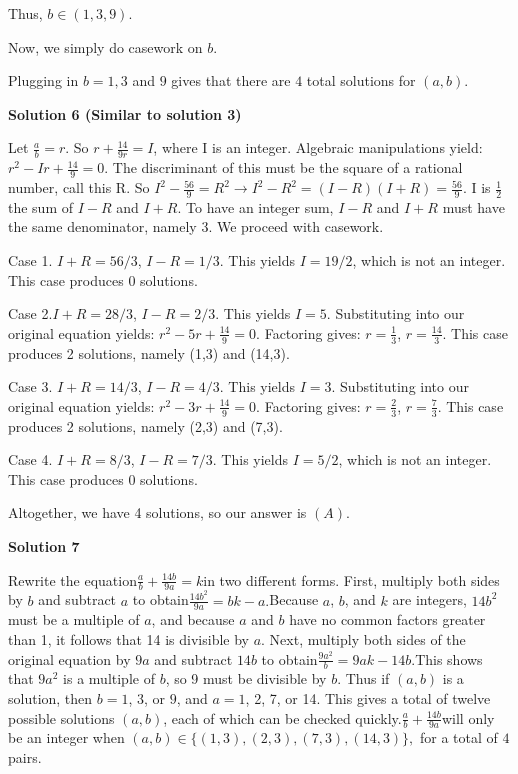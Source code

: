 \begin{enumerate}
 Thus, $b \in (1,3,9).$

 Now, we simply do casework on $b.$ 

 Plugging in $b = 1,3$ and $9$ gives that there are $4$ total solutions for $(a,b).$




\textbf{Solution 6 (Similar to solution 3)}

Let $\frac{a}{b} = r.$ So $r + \frac{14}{9r}=I$, where I is an integer. Algebraic manipulations yield: $r^2-Ir+\frac{14}{9}=0$. The discriminant of this must be the square of a rational number, call this R. So $I^2-\frac{56}{9}=R^2 \longrightarrow I^2-R^2=(I-R)(I+R)=\frac{56}{9}$. I is $\frac{1}{2}$ the sum of $I-R$ and $I+R$. To have an integer sum, $I-R$ and $I+R$ must have the same denominator, namely 3. We proceed with casework.

 Case 1. $I+R=56/3$, $I-R=1/3$. This yields $I=19/2$, which is not an integer. This case produces 0 solutions.

 Case 2.$I+R=28/3$, $I-R=2/3$. This yields $I=5$. Substituting into our original equation yields: $r^2-5r+\frac{14}{9}=0$. Factoring gives: $r=\frac{1}{3}$, $r=\frac{14}{3}$. This case produces 2 solutions, namely (1,3) and (14,3).

 Case 3. $I+R=14/3$, $I-R=4/3$. This yields $I=3$. Substituting into our original equation yields: $r^2-3r+\frac{14}{9}=0$. Factoring gives: $r=\frac{2}{3}$, $r=\frac{7}{3}$. This case produces 2 solutions, namely (2,3) and (7,3).

 Case 4. $I+R=8/3$, $I-R=7/3$. This yields $I=5/2$, which is not an integer. This case produces 0 solutions.

 Altogether, we have 4 solutions, so our answer is $\boxed{(A)}$.

 



\textbf{Solution 7}

Rewrite the equation$\frac{a}{b}+\frac{14b}{9a}=k$in two different forms. First, multiply both sides by $b$ and subtract $a$ to obtain$\frac{14b^2}{9a}=bk-a.$Because $a$, $b$, and $k$ are integers, $14b^2$ must be a multiple of $a$, and because $a$ and $b$ have no common factors greater than 1, it follows that 14 is divisible by $a$. Next, multiply both sides of the original equation by $9a$ and subtract $14b$ to obtain$\frac{9a^2}{b}=9ak-14b.$This shows that $9a^2$ is a multiple of $b$, so 9 must be divisible by $b$. Thus if $(a,b)$ is a solution, then $b=1$, $3$, or $9$, and $a=1$, 2, 7, or 14. This gives a total of twelve possible solutions $(a,b)$, each of which can be checked quickly.$\frac{a}{b}+\frac{14b}{9a}$will only be an integer when $(a,b) \in \{(1,3),(2,3), (7,3), (14,3)\},$ for a total of $\boxed{4}$ pairs.


\end{enumerate}
